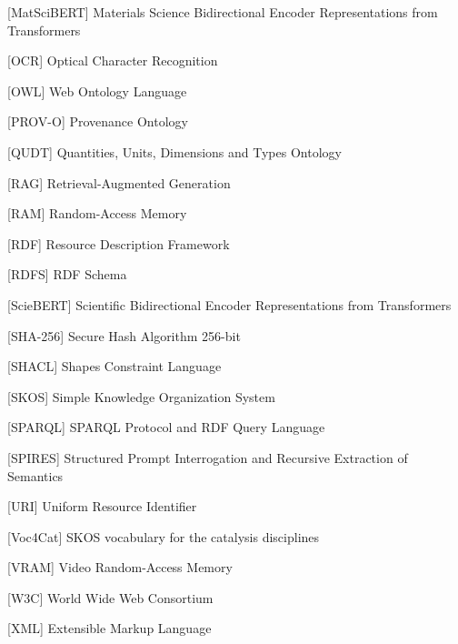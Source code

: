 \begin{singlespace}
\begin{acronym}[\rule{\abbreviationlabelwidth}{0pt}]
    [MatSciBERT]
        {Materials Science Bidirectional Encoder Representations from Transformers}

    [OCR]
        {Optical Character Recognition}

    [OWL]
        {Web Ontology Language}

    [PROV-O]
        {Provenance Ontology}

    [QUDT]
        {Quantities, Units, Dimensions and Types Ontology}

    [RAG]
        {Retrieval-Augmented Generation}

    [RAM]
        {Random-Access Memory}

    [RDF]
        {Resource Description Framework}

    [RDFS]
        {RDF Schema}

    [ScieBERT]
        {Scientific Bidirectional Encoder Representations from Transformers}

    [SHA-256]
        {Secure Hash Algorithm 256-bit}

    [SHACL]
        {Shapes Constraint Language}

    [SKOS]
        {Simple Knowledge Organization System}

    [SPARQL]
        {SPARQL Protocol and RDF Query Language}

    [SPIRES]
        {Structured Prompt Interrogation and Recursive Extraction of Semantics}

    [URI]
        {Uniform Resource Identifier}

    [Voc4Cat]
        {SKOS vocabulary for the catalysis disciplines}

    [VRAM]
        {Video Random-Access Memory}

    [W3C]
        {World Wide Web Consortium}

    [XML]
        {Extensible Markup Language}

\end{acronym}

\end{singlespace}
\endgroup
